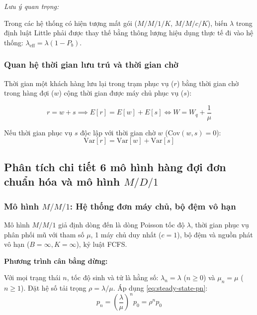 \textit{Lưu ý quan trọng:} 

Trong các hệ thống có hiện tượng mất gói ($M/M/1/K$, $M/M/c/K$), biến $\lambda$ trong định luật Little phải được thay thế bằng thông lượng hiệu dụng thực tế đi vào hệ thống: $\lambda_{\text{eff}} = \lambda(1 - P_b)$.

\subsubsection{Quan hệ thời gian lưu trú và thời gian chờ}
\hspace{0.5cm}Thời gian một khách hàng lưu lại trong trạm phục vụ ($r$) bằng thời gian chờ trong hàng đợi ($w$) cộng thời gian được máy chủ phục vụ ($s$):

\begin{equation}
    r = w + s \implies E[r] = E[w] + E[s] \iff W = W_q + \frac{1}{\mu}
\end{equation}

Nếu thời gian phục vụ $s$ độc lập với thời gian chờ $w$ ($\text{Cov}(w, s) = 0$):
\begin{equation}
    \text{Var}[r] = \text{Var}[w] + \text{Var}[s]
\end{equation}

\subsection{Phân tích chi tiết 6 mô hình hàng đợi đơn chuẩn hóa và mô hình \texorpdfstring{$M/D/1$}{M/D/1}}
\label{subsec:chi-tiet-cac-mo-hinh}


\subsubsection{Mô hình \texorpdfstring{$M/M/1$}{M/M/1}: Hệ thống đơn máy chủ, bộ đệm vô hạn}

\hspace{0.5cm}Mô hình $M/M/1$ giả định dòng đến là dòng Poisson tốc độ $\lambda$, thời gian phục vụ phân phối mũ với tham số $\mu$, 1 máy chủ duy nhất ($c=1$), bộ đệm và nguồn phát vô hạn ($B=\infty, K=\infty$), kỷ luật FCFS.

\textbf{Phương trình cân bằng dừng:}

Với mọi trạng thái $n$, tốc độ sinh và tử là hằng số: $\lambda_n = \lambda$ ($n \ge 0$) và $\mu_n = \mu$ ($n \ge 1$). Đặt hệ số tải trọng $\rho = \lambda / \mu$. Áp dụng \eqref{eq:steady-state-pn}:
\begin{equation}
    p_n = \left(\frac{\lambda}{\mu}\right)^n p_0 = \rho^n p_0
\end{equation}


